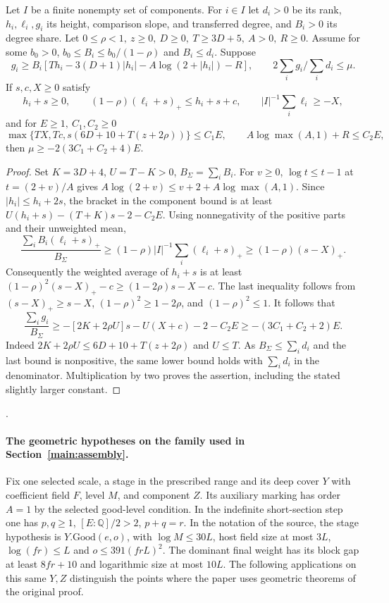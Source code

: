 \begin{proposition}\label{newtheta:aggregate}
Let \(I\) be a finite nonempty set of components. For \(i\in I\) let
\(d_i>0\) be its rank, \(h_i,\ell_i,g_i\) its height, comparison
slope, and transferred degree, and \(B_i>0\) its degree share.
Let \(0\le \rho<1,\ z\ge0,\ D\ge0,\ T\ge3D+5,\ A>0,\ R\ge0\).
Assume for some \(b_0>0\), \(b_0\le B_i\le b_0/(1-\rho)\) and
\(B_i\le d_i\). Suppose
\[
 g_i\ge B_i[Th_i-3(D+1)|h_i|-A\log(2+|h_i|)-R],
 \qquad 2\sum_i g_i/\sum_i d_i\le\mu .
\]
If \(s,c,X\ge0\) satisfy
\[
 h_i+s\ge0,\qquad
 (1-\rho)(\ell_i+s)_+\le h_i+s+c,\qquad
 |I|^{-1}\sum_i\ell_i\ge-X ,
\]
and for \(E\ge1,\ C_1,C_2\ge0\)
\[
 \max\{TX,Tc,s(6D+10+T(z+2\rho))\}\le C_1E,\qquad
 A\log\max(A,1)+R\le C_2E ,
\]
then \(\mu\ge-2(3C_1+C_2+4)E\).
\end{proposition}
\begin{proof}
Set \(K=3D+4\), \(U=T-K>0\), \(B_\Sigma=\sum_i B_i\).
For \(v\ge0\), \(\log t\le t-1\) at \(t=(2+v)/A\) gives
\(A\log(2+v)\le v+2+A\log\max(A,1)\).
Since \(|h_i|\le h_i+2s\), the bracket in the component bound is
at least \(U(h_i+s)-(T+K)s-2-C_2E\).
Using nonnegativity of the positive parts and their unweighted mean,
\[
 \frac{\sum_i B_i(\ell_i+s)_+}{B_\Sigma}
 \ge(1-\rho)|I|^{-1}\sum_i(\ell_i+s)_+
 \ge(1-\rho)(s-X)_+ .
\]
Consequently the weighted average of \(h_i+s\) is at least
\((1-\rho)^2(s-X)_+-c\ge(1-2\rho)s-X-c\).
The last inequality follows from \((s-X)_+\ge s-X\),
\((1-\rho)^2\ge1-2\rho\), and \((1-\rho)^2\le1\).
It follows that
\[
 \frac{\sum_i g_i}{B_\Sigma}
 \ge-[2K+2\rho U]s-U(X+c)-2-C_2E
 \ge-(3C_1+C_2+2)E .
\]
Indeed \(2K+2\rho U\le6D+10+T(z+2\rho)\) and \(U\le T\).
As \(B_\Sigma\le\sum_i d_i\) and the last bound is nonpositive,
the same lower bound holds with \(\sum_i d_i\) in the denominator.
Multiplication by two proves the assertion, including the stated
slightly larger constant.
\end{proof}
.

\paragraph{The geometric hypotheses on the family used in Section~\ref{main:assembly}.}
Fix one selected scale, a stage in the prescribed range and its
deep cover \(Y\) with coefficient field \(F\), level \(M\), and
component \(Z\). Its auxiliary marking has order \(A=1\) by the
selected good-level condition. In the indefinite short-section
step one has \(p,q\ge1\), \([E:\mathbb Q]/2>2\), \(p+q=r\).
In the notation of the source, the stage hypothesis is
\(Y.\mathrm{Good}(e,o)\), with
\(\log M\le30L\), host field size at most \(3L\), \(\log(fr)\le L\)
and \(o\le391(frL)^2\). The dominant final weight has its block
gap at least \(8fr+10\) and logarithmic size at most \(10L\).
The following applications on this same \(Y,Z\) distinguish the
points where the paper uses geometric theorems of the original proof.

